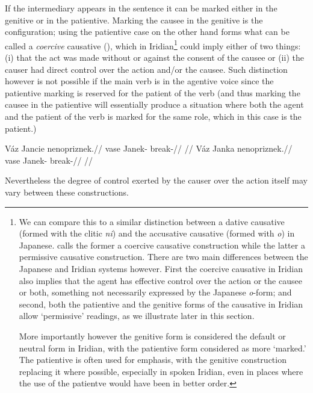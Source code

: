 If the intermediary appears in the sentence it can be marked either in the genitive or in the patientive. Marking the causee in the genitive is the  configuration; using the patientive case on the other hand forms what can be called a \emph{coercive} causative (\cite{shibatani1990,lehmann2006}), which in Iridian\footnote{We can compare this to a similar distinction between a dative causative (formed with the clitic \emph{ni}) and the accusative causative (formed with \emph{o}) in Japanese. \textcite{lehmann2006} calls the former a coercive causative construction while the latter a permissive causative construction. There are two main differences between the Japanese and Iridian systems however. First the coercive causative in Iridian also implies that the agent has effective control over the action or the causee or both, something not necessarily expressed by the Japanese \emph{o}-form; and second, both the patientive and the genitive forms of the causative in Iridian allow `permissive' readings, as we illustrate later in this section.

More importantly however the genitive form is considered the default or neutral form in Iridian, with the patientive form considered as more `marked.' The patientive is often used for emphasis, with the genitive construction replacing it where possible, especially in spoken Iridian, even in places where the use of the patientve would have been in better order.
}
could imply either of two things: (i) that the act was made without or against the consent of the causee or (ii) the causer had direct control over the action and/or the causee. Such distinction however is not possible if the main verb is in the agentive voice since the patientive marking is reserved for the patient of the verb (and thus marking the causee in the patientive will essentially produce a situation where both the agent and the patient of the verb is marked for the same role, which in this case is the patient.)

\pex
\a
\begingl
\gla Váz Jancie nenopriznek.//
\glb vase Janek-\Gen{} break-//
\glft {}//
\endgl
\a
\begingl
\gla Váz Janka nenopriznek.//
\glb vase Janek- break-//
\glft {}//
\endgl
\xe




Nevertheless the degree of control exerted by the causer over the action itself may vary between these constructions.


